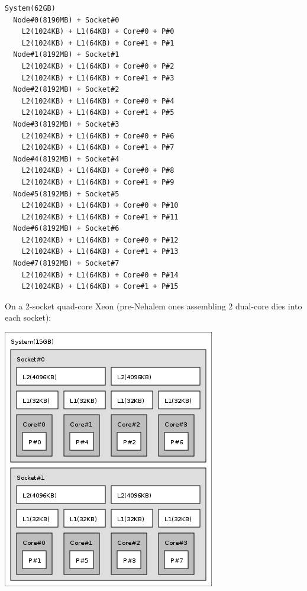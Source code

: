 \begin{Code}\begin{verbatim}System(62GB)
  Node#0(8190MB) + Socket#0
    L2(1024KB) + L1(64KB) + Core#0 + P#0
    L2(1024KB) + L1(64KB) + Core#1 + P#1
  Node#1(8192MB) + Socket#1
    L2(1024KB) + L1(64KB) + Core#0 + P#2
    L2(1024KB) + L1(64KB) + Core#1 + P#3
  Node#2(8192MB) + Socket#2
    L2(1024KB) + L1(64KB) + Core#0 + P#4
    L2(1024KB) + L1(64KB) + Core#1 + P#5
  Node#3(8192MB) + Socket#3
    L2(1024KB) + L1(64KB) + Core#0 + P#6
    L2(1024KB) + L1(64KB) + Core#1 + P#7
  Node#4(8192MB) + Socket#4
    L2(1024KB) + L1(64KB) + Core#0 + P#8
    L2(1024KB) + L1(64KB) + Core#1 + P#9
  Node#5(8192MB) + Socket#5
    L2(1024KB) + L1(64KB) + Core#0 + P#10
    L2(1024KB) + L1(64KB) + Core#1 + P#11
  Node#6(8192MB) + Socket#6
    L2(1024KB) + L1(64KB) + Core#0 + P#12
    L2(1024KB) + L1(64KB) + Core#1 + P#13
  Node#7(8192MB) + Socket#7
    L2(1024KB) + L1(64KB) + Core#0 + P#14
    L2(1024KB) + L1(64KB) + Core#1 + P#15
\end{verbatim}
\end{Code}



On a 2-socket quad-core Xeon (pre-Nehalem ones assembling 2 dual-core dies into each socket):

 \begin{ImageNoCaption}\mbox{\includegraphics[width=\textwidth]{emmett.png}}
\end{ImageNoCaption}




